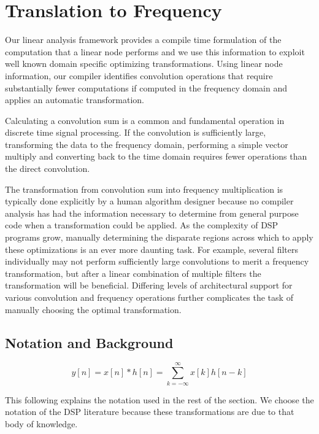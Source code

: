 
\section{Translation to Frequency}
\label{sec:freq}

Our linear analysis framework provides a compile time formulation of
the computation that a linear node performs and we use this
information to exploit well known domain specific optimizing
transformations. Using linear node information, our compiler
identifies convolution operations that require substantially fewer
computations if computed in the frequency domain and applies
an automatic transformation.

Calculating a convolution sum is a common and fundamental operation in
discrete time signal processing.  If the convolution is
sufficiently large, transforming the data to the frequency domain,
performing a simple vector multiply and converting back to the time
domain requires fewer operations than the direct convolution.

The transformation from convolution sum into frequency multiplication
is typically done explicitly by a human algorithm designer because no 
compiler analysis has had the information necessary to determine from 
general purpose code when a transformation could be applied. As the complexity of DSP 
programs grow, manually determining the disparate regions across which 
to apply these optimizations is an ever more daunting task. 
For example, several filters individually may not perform sufficiently large 
convolutions to merit a frequency transformation, but after a linear 
combination of multiple filters the transformation will be beneficial.
Differing levels of architectural support for various convolution and 
frequency operations further complicates the task of manually choosing
the optimal transformation.


\subsection{Notation and Background}
\label{sec:method-opt-notation}

\begin{equation}
\label{eqn:conv-sum-again}
y[n]=x[n]*h[n]=\sum_{k=-\infty}^{\infty}x[k]h[n-k]
\end{equation}

This following explains the notation used in the rest of the section. 
We choose the notation of the DSP literature because
these transformations are due to that body of knowledge.

